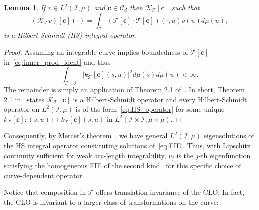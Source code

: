 \documentclass[pdflatex,iicol]{sn-jnl}%
\theoremstyle{thmstyleone}%
\newtheorem{lemma}{Lemma}%
\theoremstyle{thmstyletwo}%
\theoremstyle{thmstylethree}%
\begin{document}
\begin{lemma}\label{lemma:HS_int_opt}
    If $v \in L^2(\mathcal{I},\mu)$ and $\boldsymbol{c} \in \mathcal{C}_d$ then $\mathcal{K}_{\mathcal{T}}[\boldsymbol{c}]$ such that
    \begin{equation}\label{eq:HS_operator}
        (\mathcal{K}_{\mathcal{T}}v)[\boldsymbol{c}](\cdot) = \int_{\mathcal{I}}\left(\mathcal{T}[\boldsymbol{c}] \cdot \mathcal{T}[\boldsymbol{c}]\right)(\cdot,u)v(u) d\mu(u),
    \end{equation}
    is a Hilbert-Schmidt (HS) integral operator.
\end{lemma}

\begin{proof}
    Assuming an integrable curve implies boundedness of $\mathcal{T}[\boldsymbol{c}]$ in~\eqref{eq:inner_prod_ident} and thus
    \begin{equation}
        \int_{\mathcal{I}\times \mathcal{I}}\vert k_{\mathcal{T}}[\boldsymbol{c}](s,u)\vert^2d\mu(s)d\mu(u) < \infty.
    \end{equation}
    The remainder is simply an application of Theorem 2.1 of~\cite{fasshauer2015kernel}. In short, Theorem 2.1 in~\cite{fasshauer2015kernel} states $\mathcal{K}_{\mathcal{T}}[\boldsymbol{c}]$ is a Hilbert-Schmidt operator and every Hilbert-Schmidt operator on $L^2(\mathcal{I}, \mu)$ is of the form~\eqref{eq:HS_operator} for some unique $k_{\mathcal{T}}[\boldsymbol{c}]:(s,u) \mapsto k_{\mathcal{T}}[\boldsymbol{c}](s,u)$ in $L^2(\mathcal{I} \times \mathcal{I},\mu\times \mu)$.
\end{proof}

Consequently, by Mercer's theorem~\cite{fasshauer2015kernel}, we have general $L^2(\mathcal{I},\mu)$ eigensolutions of the HS integral operator constituting solutions of~\eqref{eq:FIE}. Thus, with Lipschitz continuity sufficient for weak arc-length integrability, $v_j$ is the $j$-th eigenfunction satisfying the homogeneous FIE of the second kind~\cite{fasshauer2015kernel} for this specific choice of curve-dependent operator. 

Notice that composition in $\mathcal{T}$ offers translation invariance of the CLO. In fact, the CLO is invariant to a larger class of transformations on the curve:
\end{document}
